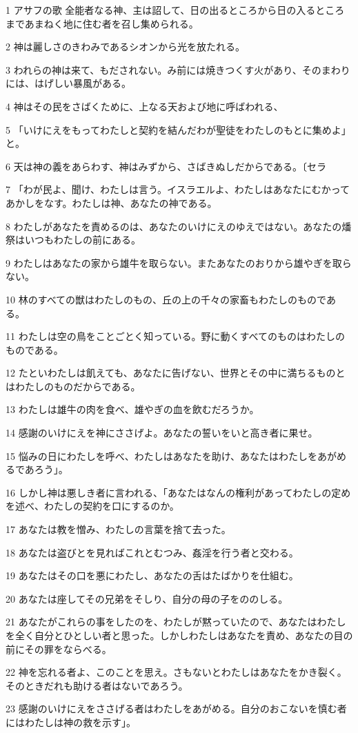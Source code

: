 \par 1 アサフの歌 全能者なる神、主は詔して、日の出るところから日の入るところまであまねく地に住む者を召し集められる。
\par 2 神は麗しさのきわみであるシオンから光を放たれる。
\par 3 われらの神は来て、もだされない。み前には焼きつくす火があり、そのまわりには、はげしい暴風がある。
\par 4 神はその民をさばくために、上なる天および地に呼ばわれる、
\par 5 「いけにえをもってわたしと契約を結んだわが聖徒をわたしのもとに集めよ」と。
\par 6 天は神の義をあらわす、神はみずから、さばきぬしだからである。〔セラ
\par 7 「わが民よ、聞け、わたしは言う。イスラエルよ、わたしはあなたにむかってあかしをなす。わたしは神、あなたの神である。
\par 8 わたしがあなたを責めるのは、あなたのいけにえのゆえではない。あなたの燔祭はいつもわたしの前にある。
\par 9 わたしはあなたの家から雄牛を取らない。またあなたのおりから雄やぎを取らない。
\par 10 林のすべての獣はわたしのもの、丘の上の千々の家畜もわたしのものである。
\par 11 わたしは空の鳥をことごとく知っている。野に動くすべてのものはわたしのものである。
\par 12 たといわたしは飢えても、あなたに告げない、世界とその中に満ちるものとはわたしのものだからである。
\par 13 わたしは雄牛の肉を食べ、雄やぎの血を飲むだろうか。
\par 14 感謝のいけにえを神にささげよ。あなたの誓いをいと高き者に果せ。
\par 15 悩みの日にわたしを呼べ、わたしはあなたを助け、あなたはわたしをあがめるであろう」。
\par 16 しかし神は悪しき者に言われる、「あなたはなんの権利があってわたしの定めを述べ、わたしの契約を口にするのか。
\par 17 あなたは教を憎み、わたしの言葉を捨て去った。
\par 18 あなたは盗びとを見ればこれとむつみ、姦淫を行う者と交わる。
\par 19 あなたはその口を悪にわたし、あなたの舌はたばかりを仕組む。
\par 20 あなたは座してその兄弟をそしり、自分の母の子をののしる。
\par 21 あなたがこれらの事をしたのを、わたしが黙っていたので、あなたはわたしを全く自分とひとしい者と思った。しかしわたしはあなたを責め、あなたの目の前にその罪をならべる。
\par 22 神を忘れる者よ、このことを思え。さもないとわたしはあなたをかき裂く。そのときだれも助ける者はないであろう。
\par 23 感謝のいけにえをささげる者はわたしをあがめる。自分のおこないを慎む者にはわたしは神の救を示す」。


